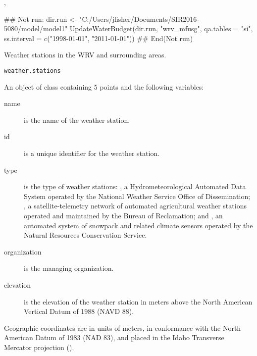 \documentclass[a4paper]{book}
\begin{document}
%
\begin{SeeAlso}\relax
{}, 
\end{SeeAlso}
%
\begin{Examples}
\begin{ExampleCode}
## Not run: 
dir.run <- "C:/Users/jfisher/Documents/SIR2016-5080/model/model1"
UpdateWaterBudget(dir.run, "wrv_mfusg", qa.tables = "si",
                  ss.interval = c("1998-01-01", "2011-01-01"))
## End(Not run)
\end{ExampleCode}
\end{Examples}
%
\begin{Description}\relax
Weather stations in the WRV and surrounding areas.
\end{Description}
%
\begin{Usage}
\begin{verbatim}
weather.stations
\end{verbatim}
\end{Usage}
%
\begin{Format}
An object of  class containing 5 points and the following variables:
\begin{description}

\item[name] is the name of the weather station.
\item[id] is a unique identifier for the weather station.
\item[type] is the type of weather stations:
, a Hydrometeorological Automated Data System operated by the National Weather Service Office of Dissemination;
, a satellite-telemetry network of automated agricultural weather stations operated and maintained by the Bureau of Reclamation; and
, an automated system of snowpack and related climate sensors operated by the Natural Resources Conservation Service.
\item[organization] is the managing organization.
\item[elevation] is the elevation of the weather station in meters above the North American Vertical Datum of 1988 (NAVD 88).

\end{description}

Geographic coordinates are in units of meters, in conformance with the North American Datum of 1983 (NAD 83), and placed in the
Idaho Transverse Mercator projection ().
\end{Format}
\end{document}
